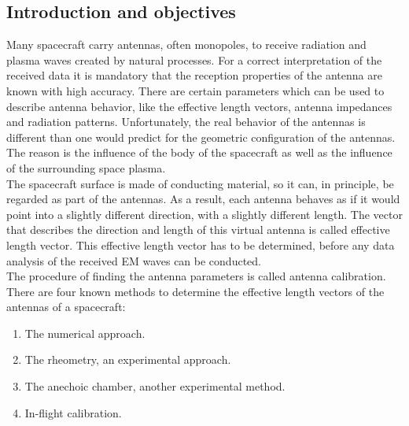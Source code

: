 \documentclass[two-column,ras]{agutex}
\begin{document}
%
%

%


\begin{article}
\section{Introduction and objectives}
Many spacecraft carry antennas, often monopoles, to receive radiation and plasma waves created by natural processes. For a correct interpretation of the received data it is mandatory that the reception properties of the antenna are known with high accuracy. There are certain parameters which can be used to describe antenna behavior, like the effective length vectors, antenna impedances and radiation patterns. Unfortunately, the real behavior of the antennas is different than one would predict for the geometric configuration of the antennas. The reason is the influence of the body of the spacecraft as well as the influence of the surrounding space plasma.\\

The spacecraft surface is made of conducting material, so it can, in principle, be regarded as part of the antennas. As a result, each antenna behaves as if it would point into a slightly different direction, with a slightly different length. The vector that describes the direction and length of this virtual antenna is called effective length vector. This effective length vector has to be determined, before any data analysis of the received EM waves can be conducted.\\

The procedure of finding the antenna parameters is called antenna calibration. There are four known methods to determine the effective length vectors of the antennas of a spacecraft:

\begin{enumerate}
\item The numerical approach.
\item The rheometry, an experimental approach.
\item The anechoic chamber, another experimental method.
\item In-flight calibration.
\end{enumerate}


\end{article}
\end{document}

